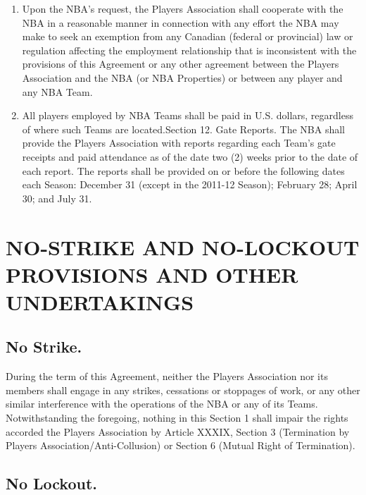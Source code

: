 \documentclass[
]{book}
\begin{document}
\begin{enumerate}
\item
  Upon the NBA's request, the Players Association shall cooperate with the NBA in a reasonable manner in connection with any effort the NBA may make to seek an exemption from any Canadian (federal or provincial) law or regulation affecting the employment relationship that is inconsistent with the provisions of this Agreement or any other agreement between the Players Association and the NBA (or NBA Properties) or between any player and any NBA Team.
\item
  All players employed by NBA Teams shall be paid in U.S. dollars, regardless of where such Teams are located.Section 12. Gate Reports. The NBA shall provide the Players Association with reports regarding each Team's gate receipts and paid attendance as of the date two (2) weeks prior to the date of each report. The reports shall be provided on or before the following dates each Season: December 31 (except in the 2011-12 Season); February 28; April 30; and July 31.
\end{enumerate}

\hypertarget{no-strike-and-no-lockout-provisions-and-other-undertakings}{%
\chapter{NO-STRIKE AND NO-LOCKOUT PROVISIONS AND OTHER UNDERTAKINGS}\label{no-strike-and-no-lockout-provisions-and-other-undertakings}}


\hypertarget{no-strike.}{%
\section{No Strike.}\label{no-strike.}}

During the term of this Agreement, neither the Players Association nor its members shall engage in any strikes, cessations or stoppages of work, or any other similar interference with the operations of the NBA or any of its Teams. Notwithstanding the foregoing, nothing in this Section 1 shall impair the rights accorded the Players Association by Article XXXIX, Section 3 (Termination by Players Association/Anti-Collusion) or Section 6 (Mutual Right of Termination).

\hypertarget{no-lockout.}{%
\section{No Lockout.}\label{no-lockout.}}
\end{document}

